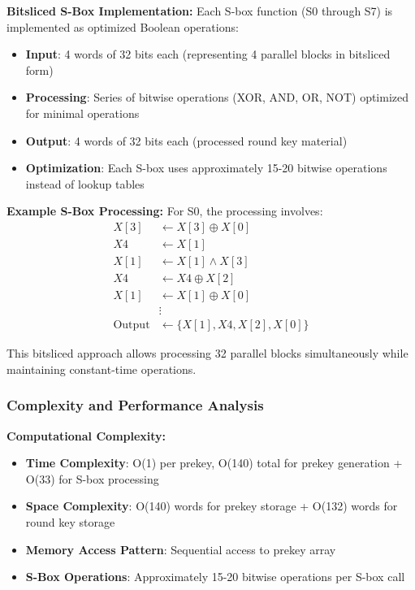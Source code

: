 \documentclass[12pt,a4paper]{article}
\begin{document}
\textbf{Bitsliced S-Box Implementation:}
Each S-box function (S0 through S7) is implemented as optimized Boolean operations:

\begin{itemize}
    \item \textbf{Input}: 4 words of 32 bits each (representing 4 parallel blocks in bitsliced form)
    \item \textbf{Processing}: Series of bitwise operations (XOR, AND, OR, NOT) optimized for minimal operations
    \item \textbf{Output}: 4 words of 32 bits each (processed round key material)
    \item \textbf{Optimization}: Each S-box uses approximately 15-20 bitwise operations instead of lookup tables
\end{itemize}

\textbf{Example S-Box Processing:}
For S0, the processing involves:
\begin{align}
X[3] &\leftarrow X[3] \oplus X[0] \\
X4 &\leftarrow X[1] \\
X[1] &\leftarrow X[1] \land X[3] \\
X4 &\leftarrow X4 \oplus X[2] \\
X[1] &\leftarrow X[1] \oplus X[0] \\
&\vdots \\
\text{Output} &\leftarrow \{X[1], X4, X[2], X[0]\}
\end{align}

This bitsliced approach allows processing 32 parallel blocks simultaneously while maintaining constant-time operations.

\subsubsection{Complexity and Performance Analysis}

\textbf{Computational Complexity:}
\begin{itemize}
    \item \textbf{Time Complexity}: O(1) per prekey, O(140) total for prekey generation + O(33) for S-box processing
    \item \textbf{Space Complexity}: O(140) words for prekey storage + O(132) words for round key storage
    \item \textbf{Memory Access Pattern}: Sequential access to prekey array
    \item \textbf{S-Box Operations}: Approximately 15-20 bitwise operations per S-box call
\end{itemize}
\end{document}
